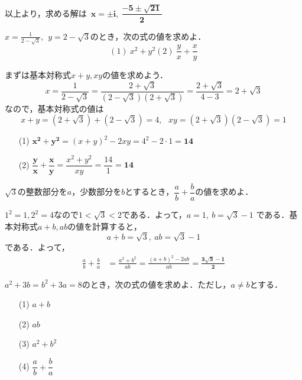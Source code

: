 \documentclass[a4paper,11pt]{ltjsarticle}
\begin{document}
以上より，求める解は~$\boldsymbol{x=\pm i,~\dfrac{-5\pm\sqrt{21}}{2}}$
\begin{toi}
$x=\displaystyle{\frac{1}{2-\sqrt3}},~~y=\displaystyle{2-\sqrt3}$のとき，次の式の値を求めよ．
\[(1)~x^2+y^2　　　　　　(2)~\frac{y}{x}+\frac{x}{y}\]
\end{toi}
\ans 
まずは基本対称式$x+y,xy$の値を求めよう．
\[x=\frac{1}{2-\sqrt3}=\frac{2+\sqrt3}{(2-\sqrt3)(2+\sqrt3)}=\frac{2+\sqrt3}{4-3}=2+\sqrt3\]
なので，基本対称式の値は
\[x+y=(2+\sqrt3)+(2-\sqrt3)=4,~~~xy=(2+\sqrt3)(2-\sqrt3)=1\]
\begin{itemize}
    \item [(1)] $\boldsymbol{x^2+y^2}=(x+y)^2-2xy=4^2-2\cdot1=\boldsymbol{14}$
    \item [(2)] $\boldsymbol{\dfrac{y}{x}+\dfrac{x}{y}}=\dfrac{x^2+y^2}{xy}=\dfrac{14}{1}=\boldsymbol{14}$
\end{itemize}
\newpage
\begin{toi}
$\sqrt 3$の整数部分を$a$，少数部分を$b$とするとき，$\dfrac{a}{b}+\dfrac{b}{a}$の値を求めよ．
\end{toi}
\ans 
$1^2=1, 2^2=4$なので$1<\sqrt3<2$である．よって，$a=1,~b=\sqrt3-1$ である．基本対称式$a+b,ab$の値を計算すると，
\[a+b=\sqrt 3,~ab=\sqrt3-1\]
である．よって，
\begin{align*}
\frac{a}{b}+\frac{b}{a} &= \frac{a^2+b^2}{ab}=\frac{(a+b)^2-2ab}{ab}=\boldsymbol{\frac{3\sqrt3-1}{2}}
\end{align*}
\begin{toi}
$a^2+3b=b^2+3a=8$のとき，次の式の値を求めよ．ただし，$a\neq b$とする．\\
\begin{minipage}{0.25\linewidth}
\begin{itemize}
    \item [(1)]$a+b$
\end{itemize}
\end{minipage}
\begin{minipage}{0.25\linewidth}
\begin{itemize}
    \item [(2)]$ab$
\end{itemize}
\end{minipage}
\begin{minipage}{0.25\linewidth}
\begin{itemize}
    \item [(3)]$a^2+b^2$
\end{itemize}
\end{minipage}
\begin{minipage}{0.25\linewidth}
\begin{itemize}
    \item [(4)]$\dfrac{a}{b}+\dfrac{b}{a}$
\end{itemize}
\end{minipage}
\end{toi}
\end{document}

